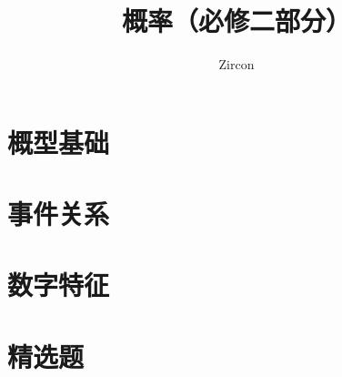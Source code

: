 \documentclass[oneside]{book}
\def\notetitle{概率（必修二部分）}
\def\noteauthor{Zircon}
\def\notedate{}
\begin{document}
\title{\heiti \LARGE \notetitle \vspace*{8\baselineskip}}
\author{\noteauthor}
\date{\notedate}

\maketitle
\newpage

\setcounter{tocdepth}{1}
\tableofcontents
\newpage

\part{概型基础}




\part{事件关系}




\part{数字特征}


\part{精选题}

\end{document}

